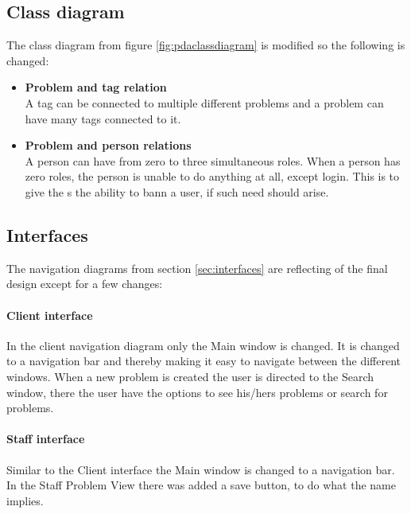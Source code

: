 \subsection{Class diagram}
\label{sub:classdiagram}
The class diagram from figure \ref{fig:pdaclassdiagram} is modified so the following is changed:
\begin{itemize}
\item \textbf{Problem and tag relation} \\
					A tag can be connected to multiple different problems and a problem can have many tags connected to it. 
\item \textbf{Problem and person relations} \\
					A person can have from zero to three simultaneous roles. When a person has zero roles, the person is unable to do anything at all, except login. This is to give the \admin s the ability to bann a user, if such need should arise.	
\end{itemize}


\subsection{Interfaces}
\label{sub:interface}
The navigation diagrams from section \ref{sec:interfaces} are reflecting of the final design except for a few changes:

\paragraph{Client interface}
In the client navigation diagram only the Main window is changed. It is changed to a navigation bar and thereby making it easy to navigate between the different windows. 
When a new problem is created the user is directed to the Search window, there the user have the options to see his/hers problems or search for problems. 

\paragraph{Staff interface}
Similar to the Client interface the Main window is changed to a navigation bar. In the Staff Problem View there was added a save button, to do what the name implies. 


